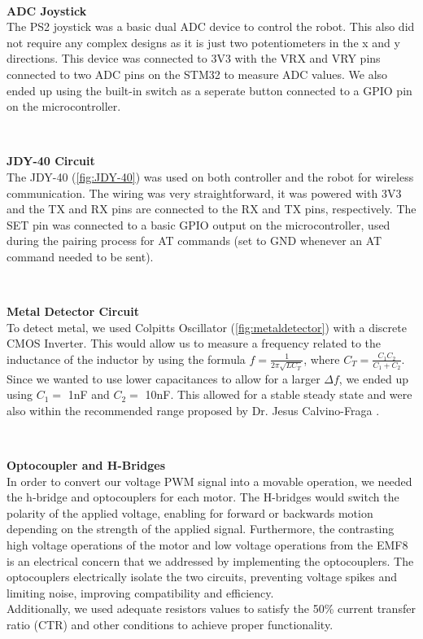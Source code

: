 \documentclass{article}
\begin{document}
\

\textbf{ADC Joystick} \\
The PS2 joystick was a basic dual ADC device to control the robot. This also did not require any complex designs as it is just two potentiometers in the x and y directions. This device was connected to 3V3 with the VRX and VRY pins connected to two ADC pins on the STM32 to measure ADC values. We also ended up using the built-in switch as a seperate button connected to a GPIO pin on the microcontroller.

\

\textbf{JDY-40 Circuit} \\
The JDY-40 (\ref{fig:JDY-40}) was used on both controller and the robot for wireless communication. The wiring was very straightforward, it was powered with 3V3 and the TX and RX pins are connected to the RX and TX pins, respectively. The SET pin was connected to a basic GPIO output on the microcontroller, used during the pairing process for AT commands (set to GND whenever an AT command needed to be sent).

\

\textbf{Metal Detector Circuit} \\
To detect metal, we used Colpitts Oscillator (\ref{fig:metaldetector}) with a discrete CMOS Inverter. This would allow us to measure a frequency related to the inductance of the inductor by using the formula $f = \frac{1}{2 \pi \sqrt{LC_T}}$, where $C_T = \frac{C_1C_2}{C_1+C_2}$. Since we wanted to use lower capacitances to allow for a larger $\Delta f$, we ended up using $C_1 =$ 1nF and $C_2 =$ 10nF. This allowed for a stable steady state and were also within the recommended range proposed by Dr. Jesus Calvino-Fraga \cite{SlidesPDF}.

\

\textbf{Optocoupler and H-Bridges} \\
In order to convert our voltage PWM signal into a movable operation, we needed the h-bridge and optocouplers for each motor. The H-bridges would switch the polarity of the applied voltage, enabling for forward or backwards motion depending on the strength of the applied signal. Furthermore, the contrasting high voltage operations of the motor and low voltage operations from the EMF8 is an electrical concern that we addressed by implementing the optocouplers. The optocouplers electrically isolate the two circuits, preventing voltage spikes and limiting noise, improving compatibility and efficiency. \\
Additionally, we used adequate resistors values to satisfy the 50\% current transfer ratio (CTR) and other conditions to achieve proper functionality\cite{LTV-847}.
\end{document}
